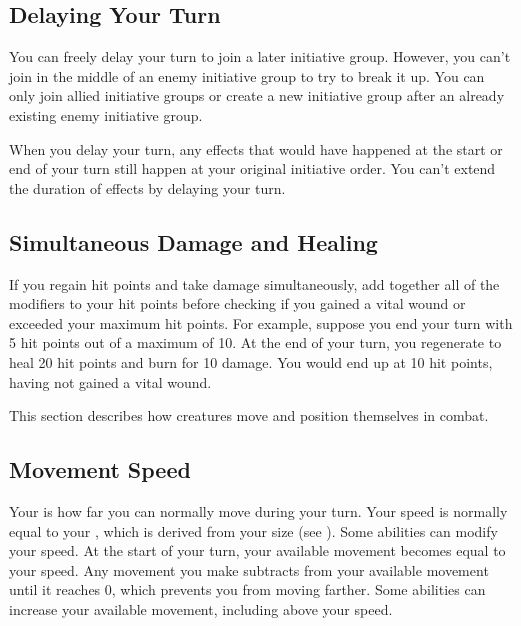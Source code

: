  \subsection{Delaying Your Turn}
    You can freely delay your turn to join a later initiative group.
    However, you can't join in the middle of an enemy initiative group to try to break it up.
    You can only join allied initiative groups or create a new initiative group after an already existing enemy initiative group.

    When you delay your turn, any effects that would have happened at the start or end of your turn still happen at your original initiative order.
    You can't extend the duration of \brief effects by delaying your turn.

  \subsection{Simultaneous Damage and Healing}\label{Simultaneous Damage and Healing}
    If you regain hit points and take damage simultaneously, add together all of the modifiers to your hit points before checking if you gained a vital wound or exceeded your maximum hit points.
    For example, suppose you end your turn with 5 hit points out of a maximum of 10.
    At the end of your turn, you regenerate to heal 20 hit points and burn for 10 damage.
    You would end up at 10 hit points, having not gained a vital wound.


  This section describes how creatures move and position themselves in combat.

  \subsection{Movement Speed}\label{Movement Speed}
    Your  is how far you can normally move during your turn.
    Your speed is normally equal to your , which is derived from your size (see ).
    Some abilities can modify your speed.
    At the start of your turn, your available movement becomes equal to your speed.
    Any movement you make subtracts from your available movement until it reaches 0, which prevents you from moving farther.
    Some abilities can increase your available movement, including above your speed.


